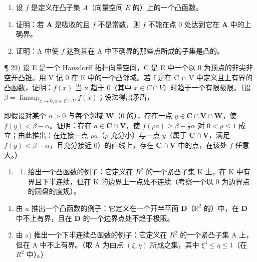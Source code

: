 \begin{enumerate}
\def\labelenumi{\arabic{enumi})}
\setcounter{enumi}{27}
\tightlist
\item
  设 \(f\) 是定义在凸子集 \(A\)（向量空间 \(E\) 的）上的一个凸函数。
\end{enumerate}

\begin{enumerate}
\def\labelenumi{\alph{enumi})}
\item
  证明：若 \(\mathbf{A}\) 是吸收的且 \(f\) 不是常数，则 \(f\) 不能在点 0 处达到它在 \(\mathbf{A}\) 中的上确界。
\item
  证明：A 中使 \(f\) 达到其在 A 中下确界的那些点所成的子集是凸的。
\end{enumerate}

¶ 29) 设 E 是一个 Hausdorff 拓扑向量空间，C 是 E 中一个以 0 为顶点的非尖非空开凸锥。用 V 记 0 在 E 中的一个凸邻域。若 f 是在 C ∩ V 中定义且上有界的凸函数，证明：\(f(x)\) 当 x 趋于 0（其中 \(x \in C \cap V\)）时趋于一个有限极限。（设 \(\beta = \limsup_{x \to 0, x \in C \cap V} f(x)\)；设法得出矛盾，

即假设对某个 \(\alpha > 0\) 与每个邻域 \(\mathbf{W}\)（\(0\) 的），存在一点 \(y \in \mathbf{C} \cap \mathbf{V} \cap \mathbf{W}\)，使 \(f(y) < \beta - \alpha\)。证明：存在 \(a \in \mathbf{C} \cap \mathbf{V}\)，使 \(f(\rho a) \geqslant \beta - \frac{1}{2}\alpha\) 对 \(0 < \rho \leqslant 1\) 成立；由此推出：在连接一点 \(\rho a\)（\(\rho\) 充分小）与一点 \(y\)（属于 \(\mathbf{C} \cap \mathbf{V}\)，满足 \(f(y) < \beta - \alpha\)，且充分接近 \(0\)）的直线上，存在 \(\mathbf{C} \cap \mathbf{V}\) 中的点，在该处 \(f\) 任意大。）

\begin{enumerate}
\def\labelenumi{\arabic{enumi})}
\setcounter{enumi}{29}
\tightlist
\item
  \begin{enumerate}
  \def\labelenumii{\alph{enumii})}
  \tightlist
  \item
    给出一个凸函数的例子：它定义在 \(R^{2}\) 的一个紧凸子集 K 上，在 K 中有界且下半连续，但在 K 的边界上一点处不连续（考察一个以 0 为边界点的圆盘的度规）。
  \end{enumerate}
\end{enumerate}

\begin{enumerate}
\def\labelenumi{\alph{enumi})}
\setcounter{enumi}{1}
\item
  由 \(a\) 推出一个凸函数的例子：它定义在一个开半平面 \(\mathbf{D}\)（\(\mathbb{R}^2\) 的）中，在 \(\mathbf{D}\) 中不上有界，且在 \(\mathbf{D}\) 的一个边界点处不趋于极限。
\item
  由 a) 推出一个下半连续凸函数的例子：它定义在 \(R^{2}\) 的一个紧凸子集 A 上，但在 A 中不上有界。（取 A 为由点 \((\xi, \eta)\) 所成之集，其中 \(\xi^{4} \leqslant \eta \leqslant 1\)（在 \(R^{2}\) 中）。）
\end{enumerate}

